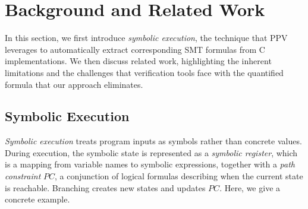 \section{Background and Related Work}
\label{sec:background}
In this section, we first introduce \emph{symbolic execution}, the technique that PPV leverages to automatically extract corresponding SMT formulas from C implementations. We then discuss related work, highlighting the inherent limitations and the challenges that verification tools face with the quantified formula that our approach eliminates.


\subsection{Symbolic Execution}

\emph{Symbolic execution} treats program inputs as symbols rather than
concrete values. During execution, the symbolic state is represented
as a \emph{symbolic register}, which is a mapping from variable names to symbolic expressions, together with a \emph{path constraint} \(PC\), a conjunction of
logical formulas describing when the current state is reachable. 
Branching creates new states and updates \(PC\). Here, we give a concrete example.

